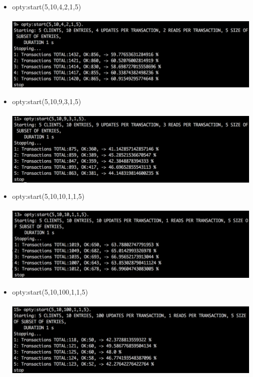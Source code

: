 \documentclass[a4paper, 11pt]{article}
\begin{document}
\begin{itemize}
\item opty:start(5,10,4,2,1,5)\\\\
\includegraphics[scale=0.5]{images/exp-iv-2.png} \\
\item opty:start(5,10,9,3,1,5)\\\\
\includegraphics[scale=0.5]{images/exp-iv-4.png} \\
\item opty:start(5,10,10,1,1,5)\\\\
\includegraphics[scale=0.5]{images/exp-iv-6.png} \\
\item opty:start(5,10,100,1,1,5)\\\\
\includegraphics[scale=0.5]{images/exp-iv-8.png} \\
\end{itemize}
\end{document}
